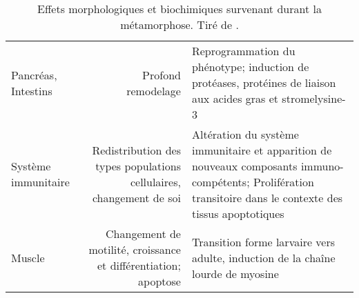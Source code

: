 \begin{table}[!htbp]
\begin{tabularx}{\textwidth}{L N M}
Pancréas, Intestins
					& Profond remodelage
					& Reprogrammation du phénotype; induction de protéases, protéines de liaison aux acides gras et stromelysine-3 \tabularnewline

Système immunitaire
					& Redistribution des types populations cellulaires, changement de soi	
					& Altération du système immunitaire et apparition de nouveaux composants immuno-compétents; Prolifération transitoire dans le contexte des tissus apoptotiques	\tabularnewline

Muscle
					& Changement de motilité, croissance et différentiation; apoptose
					& Transition forme larvaire vers adulte, induction de la chaîne lourde de myosine \tabularnewline

\bottomrule

\end{tabularx}
\caption[Effets morphologiques et biochimiques survenant durant la métamorphose]
{
Effets morphologiques et biochimiques survenant durant la métamorphose.
Tiré de \citet{Tata2006}.
}
\label{tab:metamorphosis}

\def\tabularxcolumn#1{p{#1}}
\end{table}